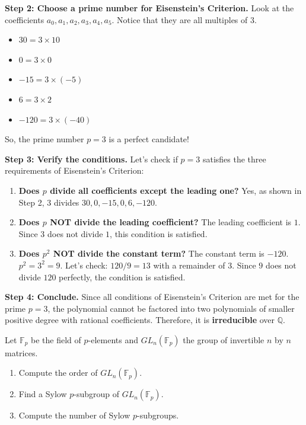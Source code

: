 \begin{solution}
\textbf{Step 2: Choose a prime number for Eisenstein's Criterion.}
Look at the coefficients $a_0, a_1, a_2, a_3, a_4, a_5$. Notice that they are all multiples of $3$. 
\begin{itemize}
    \item $30 = 3 \times 10$
    \item $0 = 3 \times 0$
    \item $-15 = 3 \times (-5)$
    \item $6 = 3 \times 2$
    \item $-120 = 3 \times (-40)$
\end{itemize}
So, the prime number $p = 3$ is a perfect candidate!

\textbf{Step 3: Verify the conditions.}
Let's check if $p=3$ satisfies the three requirements of Eisenstein's Criterion:
\begin{enumerate}
    \item \textbf{Does $p$ divide all coefficients except the leading one?} 
       Yes, as shown in Step 2, $3$ divides $30, 0, -15, 0, 6, -120$.
    \item \textbf{Does $p$ NOT divide the leading coefficient?}
       The leading coefficient is $1$. Since $3$ does not divide $1$, this condition is satisfied.
    \item \textbf{Does $p^2$ NOT divide the constant term?}
       The constant term is $-120$. $p^2 = 3^2 = 9$.
       Let's check: $120 / 9 = 13$ with a remainder of $3$. 
       Since $9$ does not divide $120$ perfectly, the condition is satisfied.
\end{enumerate}

\textbf{Step 4: Conclude.}
Since all conditions of Eisenstein's Criterion are met for the prime $p=3$, the polynomial cannot be factored into two polynomials of smaller positive degree with rational coefficients. Therefore, it is \textbf{irreducible} over $\mathbb{Q}$.
\end{solution}

\begin{exercise}
\label{algebra:2012:2}
Let $\mathbb{F}_p$ be the field of $p$-elements and $GL_n(\mathbb{F}_p)$ the group of invertible $n$ by $n$ matrices.
\begin{enumerate}
    \item Compute the order of $GL_n(\mathbb{F}_p)$.
    \item Find a Sylow $p$-subgroup of $GL_n(\mathbb{F}_p)$.
    \item Compute the number of Sylow $p$-subgroups.
\end{enumerate}
\end{exercise}

